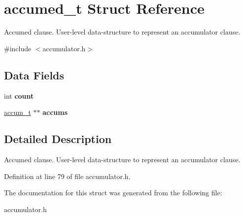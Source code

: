\hypertarget{structaccumed__t}{\section{accumed\-\_\-t Struct Reference}
\label{structaccumed__t}
}


Accumed clause. User-\/level data-\/structure to represent an accumulator clause.  




{\ttfamily \#include $<$accumulator.\-h$>$}

\subsection*{Data Fields}
\begin{DoxyCompactItemize}
\item 
\hypertarget{structaccumed__t_a1b6aeb8949f9d0dec8820b19b461a362}{int {\bfseries count}}\label{structaccumed__t_a1b6aeb8949f9d0dec8820b19b461a362}

\item 
\hypertarget{structaccumed__t_ab7567c860e640020bbe36bbff33262d6}{\hyperlink{structaccum__t}{accum\-\_\-t} $\ast$$\ast$ {\bfseries accums}}\label{structaccumed__t_ab7567c860e640020bbe36bbff33262d6}

\end{DoxyCompactItemize}


\subsection{Detailed Description}
Accumed clause. User-\/level data-\/structure to represent an accumulator clause. 

Definition at line 79 of file accumulator.\-h.



The documentation for this struct was generated from the following file\-:\begin{DoxyCompactItemize}
\item 
accumulator.\-h\end{DoxyCompactItemize}
